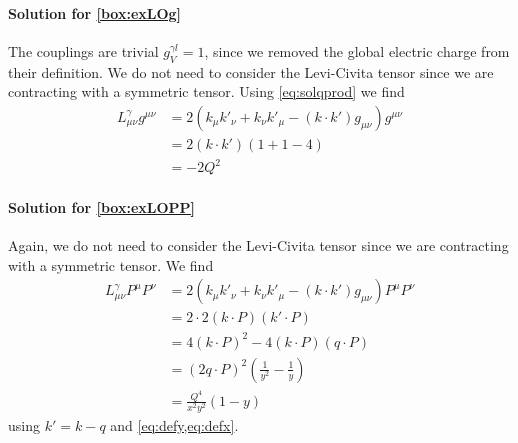 \paragraph{Solution for \cref{box:exLOg}}
The couplings are trivial $g_{V}^{\gamma l} = 1$, since we removed the global electric charge from their definition.
We do not need to consider the Levi-Civita tensor since we are contracting with a symmetric tensor.
Using \cref{eq:solqprod} we find
\begin{align}
    L^\gamma_{\mu\nu} g^{\mu\nu} &=2\left(k_\mu k'_\nu + k_\nu k'_\mu - (k \cdot k') g_{\mu\nu}\right) g^{\mu\nu}\\
    &=2(k\cdot k')(1 + 1 -4)\\
    &= -2 Q^2
\end{align}

\paragraph{Solution for \cref{box:exLOPP}}
Again, we do not need to consider the Levi-Civita tensor since we are contracting with a symmetric tensor.
We find
\begin{align}
    L^\gamma_{\mu\nu} P^{\mu} P^{\nu} &= 2\left(k_\mu k'_\nu + k_\nu k'_\mu - (k \cdot k') g_{\mu\nu}\right) P^{\mu} P^{\nu}\\
    &= 2 \cdot 2 (k\cdot P) (k' \cdot P)\\
    &= 4 (k\cdot P)^2 - 4 (k \cdot P)(q \cdot P)\\
    &= (2 q \cdot P)^2 \left(\frac 1 {y^2} - \frac 1 y\right)\\
    &= \frac{Q^4}{x^2 y^2}(1-y)
\end{align}
using $k' = k-q$ and \cref{eq:defy,eq:defx}.

